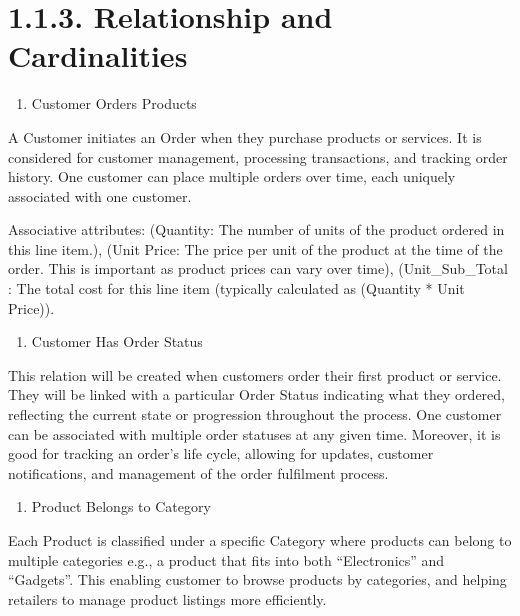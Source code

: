 \documentclass[
]{article}
\providecommand{\tightlist}{%
  \setlength{\itemsep}{0pt}\setlength{\parskip}{0pt}}
\begin{document}
\hypertarget{relationship-and-cardinalities}{%
\section{1.1.3. Relationship and
Cardinalities}\label{relationship-and-cardinalities}}

\begin{enumerate}
\def\labelenumi{\arabic{enumi}.}
\tightlist
\item
  Customer Orders Products
\end{enumerate}

A Customer initiates an Order when they purchase products or services.
It is considered for customer management, processing transactions, and
tracking order history. One customer can place multiple orders over
time, each uniquely associated with one customer.

Associative attributes: (Quantity: The number of units of the product
ordered in this line item.), (Unit Price: The price per unit of the
product at the time of the order. This is important as product prices
can vary over time), (Unit\_Sub\_Total : The total cost for this line
item (typically calculated as (Quantity * Unit Price)).

\begin{enumerate}
\def\labelenumi{\arabic{enumi}.}
\setcounter{enumi}{1}
\tightlist
\item
  Customer Has Order Status
\end{enumerate}

This relation will be created when customers order their first product
or service. They will be linked with a particular Order Status
indicating what they ordered, reflecting the current state or
progression throughout the process. One customer can be associated with
multiple order statuses at any given time. Moreover, it is good for
tracking an order's life cycle, allowing for updates, customer
notifications, and management of the order fulfilment process.

\begin{enumerate}
\def\labelenumi{\arabic{enumi}.}
\setcounter{enumi}{2}
\tightlist
\item
  Product Belongs to Category
\end{enumerate}

Each Product is classified under a specific Category where products can
belong to multiple categories e.g., a product that fits into both
``Electronics'' and ``Gadgets''. This enabling customer to browse
products by categories, and helping retailers to manage product listings
more efficiently.
\end{document}

